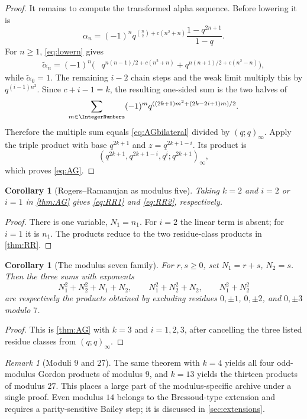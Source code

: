 \documentclass[11pt]{article}
\numberwithin{equation}{section}
\newtheorem{corollary}[theorem]{Corollary}
\theoremstyle{definition}
\theoremstyle{remark}
\newtheorem{remark}[theorem]{Remark}
\begin{document}
\begin{proof}
It remains to compute the transformed alpha sequence.  Before lowering it is
\[
\alpha_n=(-1)^nq^{\binom n2+c(n^2+n)}
\frac{1-q^{2n+1}}{1-q}.
\]
For $n\ge1$, \eqref{eq:lowern} gives
\begin{align*}
\widetilde\alpha_n=(-1)^n\biggl(&
q^{n(n-1)/2+c(n^2+n)}
+q^{n(n+1)/2+c(n^2-n)}\biggr),
\end{align*}
while $\widetilde\alpha_0=1$.  The remaining $i-2$ chain steps and the weak
limit multiply this by $q^{(i-1)n^2}$.  Since
$c+i-1=k$, the resulting one-sided sum is the two halves of
\begin{equation}\label{eq:AGbilateral}
\sum_{m\in\IntegerNumbers}(-1)^m
q^{((2k+1)m^2+(2k-2i+1)m)/2}.
\end{equation}
Therefore the multiple sum equals \eqref{eq:AGbilateral} divided by
$(q;q)_\infty$.  Apply the triple product with base $q^{2k+1}$ and
$z=q^{2k+1-i}$.  Its product is
\[
(q^{2k+1},q^{2k+1-i},q^i;q^{2k+1})_\infty,
\]
which proves \eqref{eq:AG}.
\end{proof}

\begin{corollary}[Rogers--Ramanujan as modulus five]\label{cor:AG-RR}
Taking $k=2$ and $i=2$ or $i=1$ in \cref{thm:AG} gives
\eqref{eq:RR1} and \eqref{eq:RR2}, respectively.
\end{corollary}
\begin{proof}
There is one variable, $N_1=n_1$.  For $i=2$ the linear term is absent; for
$i=1$ it is $n_1$.  The products reduce to the two residue-class products in
\cref{thm:RR}.
\end{proof}

\begin{corollary}[The modulus seven family]\label{cor:mod7}
For $r,s\ge0$, set $N_1=r+s$, $N_2=s$.  Then the three sums with exponents
\[
N_1^2+N_2^2+N_1+N_2,\qquad
N_1^2+N_2^2+N_2,\qquad
N_1^2+N_2^2
\]
are respectively the products obtained by excluding residues
$0,\pm1$, $0,\pm2$, and $0,\pm3$ modulo $7$.
\end{corollary}
\begin{proof}
This is \cref{thm:AG} with $k=3$ and $i=1,2,3$, after cancelling the three
listed residue classes from $(q;q)_\infty$.
\end{proof}

\begin{remark}[Moduli $9$ and $27$]
The same theorem with $k=4$ yields all four odd-modulus Gordon products of
modulus $9$, and $k=13$ yields the thirteen products of modulus $27$.  This
places a large part of the modulus-specific archive under a single proof.
Even modulus $14$ belongs to the Bressoud-type extension and requires a
parity-sensitive Bailey step; it is discussed in \cref{sec:extensions}.
\end{remark}
\end{document}
